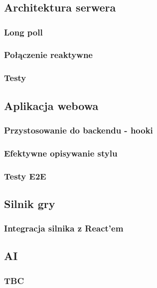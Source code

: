\chapter{\ChapterTitleRealizationAspects}
\label{sec:wybrane-aspekty-realizacji}

\section{Architektura serwera}

\subsection{Long poll}

\subsection{Połączenie reaktywne}

\subsection{Testy}


\section{Aplikacja webowa}

\subsection{Przystosowanie do backendu - hooki}

\subsection{Efektywne opisywanie stylu}

\subsection{Testy E2E}


\section{Silnik gry}

\subsection{Integracja silnika z React'em}


\section{AI}

\subsection{TBC}

